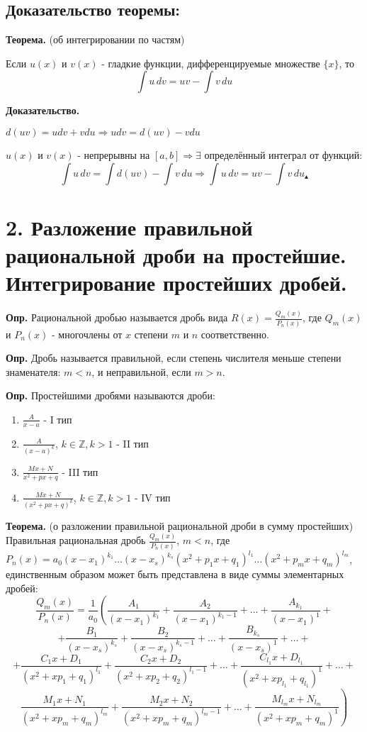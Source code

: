 \documentclass[11pt]{article}
\begin{document}
\subsection*{Доказательство теоремы:}
\par\textbf{Теорема.} (об интегрировании по частям)
\par Если $u(x)$ и $v(x)$ - гладкие функции, дифференцируемые множестве $\{x\}$, то $$\int u \, dv = uv - \int v \, du$$
\par\textbf{Доказательство.}
\par $d(uv) = udv + vdu \Rightarrow udv = d(uv) - vdu$
\par $u(x)$ и $v(x)$ - непрерывны на $[a, b] \Rightarrow \exists$ определённый интеграл от функций:
$$\int u \, dv = \int d(uv) - \int v \, du \Rightarrow \int u\, dv = uv - \int v \, du _{\blacktriangle}$$


\section*{2. Разложение правильной рациональной дроби на простейшие. Интегрирование простейших дробей.}
\textbf{Опр.} Рациональной дробью называется дробь вида \(R(x) = \frac{Q_{m}(x)}{P_{n}(x)}\), где \(Q_{m}(x)\) и \(P_{n}(x)\) - многочлены от \(x\) степени \(m\) и \(n\) соответственно.\par
\textbf{Опр.} Дробь называется правильной, если степень числителя меньше степени знаменателя: \(m < n\), и неправильной, если \(m > n\).\par
\textbf{Опр.} Простейшими дробями называются дроби:
\begin{enumerate}
\item {\Large \(\frac{A}{x-a}\)} - I тип
\item {\Large \(\frac{A}{(x-a)^k}\)}, \(k \in \mathbb{Z} , k > 1\) - II тип
\item {\Large \(\frac{Mx + N}{x^2 + px + q}\)} - III тип
\item {\Large \(\frac{Mx + N}{(x^2 + px + q)^k}\)}, \(k \in \mathbb{Z}, k > 1\) - IV тип
\end{enumerate}

\par
\textbf{Теорема.} (о разложении правильной рациональной дроби в сумму простейших)
Правильная рациональная дробь {\Large \(\frac{Q_m(x)}{P_n(x)}\)}, \(m < n\),
где \(P_n(x) = a_{0}(x - x_{1})^{k_{1}} \dots (x - x_{s})^{k_{s}}(x^2 + p_{1}x + q_{1})^{l_{1}} \dots (x^2 + p_{m}x + q_{m})^{l_{m}}\),
единственным образом может быть представлена в виде суммы элементарных дробей:
\[\frac{Q_m(x)}{P_n(x)} = \frac{1}{a_{0}} \left( \frac{A_{1}}{(x - x_{1})^{k_{1}}} + \frac{A_{2}}{(x - x_{1})^{k_{1}-1}} + \dots + \frac{A_{k_{1}}}{(x - x_{1})^{1}} + \right.\]
\[+ \frac{B_{1}}{(x - x_{s})^{k_{s}}} + \frac{B_{2}}{(x - x_{s})^{k_{s}-1}} + \dots + \frac{B_{k_{s}}}{(x - x_{s})^{1}} + \dots  +\]
\[+ \frac{C_{1}x + D_{1}}{(x^2 + xp_{1} + q_{1})^{l_{1}}} + \frac{C_{2}x + D_{2}}{(x^2 + xp_{2} + q_{2})^{l_{1}-1}} + \dots + \frac{C_{l_{1}}x + D_{l_{1}}}{(x^2 + xp_{l_{1}} + q_{l_{1}})^{1}} + \dots + \]
\[\left. \frac{M_{1}x + N_{1}}{(x^2 + xp_{m} + q_{m})^{l_{m}}} + \frac{M_{2}x + N_{2}}{(x^2 + xp_{m} + q_{m})^{l_{m}-1}} + \dots + \frac{M_{l_{m}}x + N_{l_{m}}}{(x^2 + xp_{m} + q_{m})^{1}} \right)\]
\end{document}
